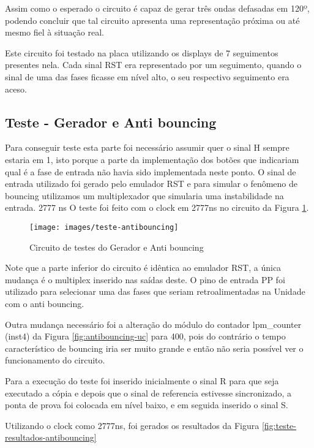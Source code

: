 \documentclass[12pt,a4paper,openany]{abntex2}
\begin{document}
Assim como o esperado o circuito é capaz de gerar três ondas defasadas em 120º, podendo concluir que tal circuito apresenta uma representação próxima ou até mesmo fiel à situação real.

Este circuito foi testado na placa utilizando os displays de 7 seguimentos presentes nela. Cada sinal RST era representado por um seguimento, quando o sinal de uma das fases ficasse em nível alto, o seu respectivo seguimento era aceso. 

\subsection{Teste - Gerador e Anti bouncing}

Para conseguir teste esta parte foi necessário assumir quer o sinal H sempre estaria em 1, isto porque a parte da implementação dos botões que indicariam qual é a fase de entrada não havia sido implementada neste ponto. O sinal de entrada utilizado foi gerado pelo emulador RST e para simular o fenômeno de bouncing utilizamos um multiplexador que simularia uma instabilidade na entrada.
2777 ns
O teste foi feito com o clock em 2777ns no circuito da Figura \ref{fig:teste-antibouncing}.

\begin{figure}[!htp]
	\centering
	\caption{Circuito de testes do Gerador e Anti bouncing}
	\texttt{[image: images/teste-antibouncing]}	\label{fig:teste-antibouncing}
\end{figure}

Note que a parte inferior do circuito é idêntica ao emulador RST, a única mudança é o multiplex inserido nas saídas deste. O pino de entrada PP foi utilizado para selecionar uma das fases que seriam retroalimentadas na Unidade com o anti bouncing.

Outra mudança necessário foi a alteração do módulo do contador lpm\_counter (inst4) da Figura \ref{fig:antibouncing-uc} para 400, pois do contrário o tempo característico de bouncing iria ser muito grande e então não seria possível ver o funcionamento do circuito.

Para a execução do teste foi inserido inicialmente o sinal R para que seja executado a cópia e depois que o sinal de referencia estivesse sincronizado, a ponta de prova foi colocada em nível baixo, e em seguida inserido o sinal S.

Utilizando o clock como 2777ns, foi gerados os resultados da Figura \ref{fig:teste-resultados-antibouncing}
\end{document}
